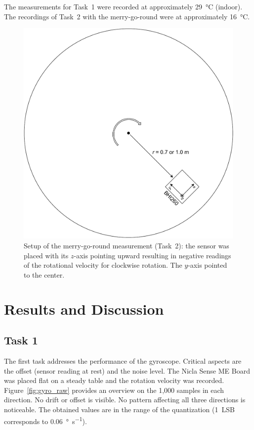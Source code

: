 \documentclass[DIV=14]{scrarticle}
\begin{document}
The measurements for Task~1 were recorded at approximately \SI{29}{\celsius} (indoor). The recordings of Task~2 with the merry-go-round were at approximately \SI{16}{\celsius}.

\vspace{3em}

\begin{figure}[h]
\centering
    \includegraphics[width=.6\textwidth]{figures/merry-go-round.drawio.pdf}
    \caption{Setup of the merry-go-round measurement (Task~2): the sensor was placed with its $z$-axis pointing upward resulting in negative readings of the rotational velocity for clockwise rotation. The $y$-axis pointed to the center.}
    \label{fig:setup}
\end{figure}

\clearpage

\section{Results and Discussion}

\subsection*{Task 1}

The first task addresses the performance of the gyroscope. Critical aspects are the offset (sensor reading at rest) and the noise level. The Nicla Sense ME Board was placed flat on a steady table and the rotation velocity was recorded. Figure~\ref{fig:gyro_raw} provides an overview on the 1,000 samples in each direction. No drift or offset is visible. No pattern affecting all three directions is noticeable. The obtained values are in the range of the quantization (1~LSB corresponds to \SI{0.06}{\degree\per\second}).
\end{document}
